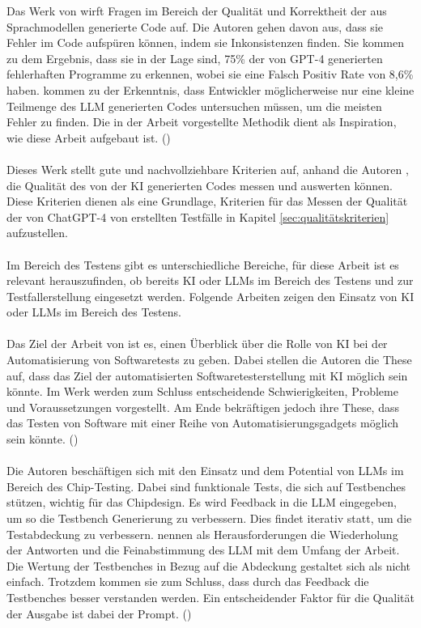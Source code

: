 \documentclass[12pt,toc=bib,toc=listof]{scrreprt}
\begin{document}
\noindent Das Werk von \textcite{Wang2024} wirft Fragen im Bereich der Qualität und Korrektheit der aus Sprachmodellen generierte Code auf. Die Autoren \textcite{Wang2024}  gehen davon aus, dass sie Fehler im Code aufspüren können, indem sie Inkonsistenzen finden. Sie kommen zu dem Ergebnis, dass sie in der Lage sind, 75\% der von GPT-4 generierten fehlerhaften Programme zu erkennen, wobei sie eine Falsch Positiv Rate von 8,6\% haben. \textcite{Wang2024} kommen zu der Erkenntnis, dass Entwickler möglicherweise nur eine kleine Teilmenge des LLM generierten Codes untersuchen müssen, um die meisten Fehler zu finden. Die in der Arbeit vorgestellte Methodik dient als Inspiration, wie diese Arbeit aufgebaut ist. (\cite{Wang2024})\\
\\
Dieses Werk stellt gute und nachvollziehbare Kriterien auf, anhand die Autoren \textcite{Wang2024}, die Qualität des von der KI generierten Codes messen und auswerten können. Diese Kriterien dienen als eine Grundlage, Kriterien für das Messen der Qualität der von ChatGPT-4 von \textcite{OpenAI2025} erstellten Testfälle in Kapitel \ref{sec:qualitätskriterien} aufzustellen.\\
\\
Im Bereich des Testens gibt es unterschiedliche Bereiche, für diese Arbeit ist es relevant herauszufinden, ob bereits KI oder LLMs im Bereich des Testens und zur Testfallerstellung eingesetzt werden. Folgende Arbeiten zeigen den Einsatz von KI oder LLMs im Bereich des Testens. \\
\\
Das Ziel der Arbeit von \textcite{Khan2024} ist es, einen Überblick über die Rolle von KI bei der Automatisierung von Softwaretests zu geben. Dabei stellen die Autoren \textcite{Khan2024} die These auf, dass das Ziel der automatisierten Softwaretesterstellung mit KI möglich sein könnte. Im Werk werden zum Schluss entscheidende Schwierigkeiten, Probleme und Voraussetzungen vorgestellt. Am Ende bekräftigen \textcite{Khan2024} jedoch ihre These, dass das Testen von Software mit einer Reihe von Automatisierungsgadgets möglich sein könnte. (\cite{Khan2024})\\
\\
Die Autoren \textcite{Bhandari2024} beschäftigen sich mit den Einsatz und dem Potential von LLMs im Bereich des Chip-Testing. Dabei sind funktionale Tests, die sich auf Testbenches stützen, wichtig für das Chipdesign. Es wird Feedback in die LLM eingegeben, um so die Testbench Generierung zu verbessern. Dies findet iterativ statt, um die Testabdeckung zu verbessern. \textcite{Bhandari2024} nennen als Herausforderungen die Wiederholung der Antworten und die Feinabstimmung des LLM mit dem Umfang der Arbeit. Die Wertung der Testbenches in Bezug auf die Abdeckung gestaltet sich als nicht einfach. Trotzdem kommen sie zum Schluss, dass durch das Feedback die Testbenches besser verstanden werden. Ein entscheidender Faktor für die Qualität der Ausgabe ist dabei der Prompt. (\cite{Bhandari2024})\\
\end{document}
